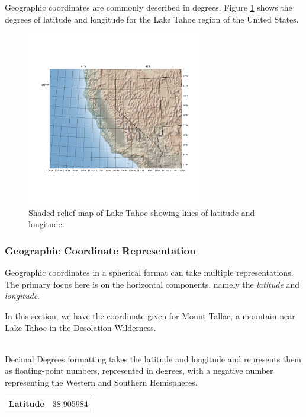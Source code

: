 Geographic coordinates are commonly described in degrees.  Figure 
\ref{fig:figure_1_1} shows the degrees of latitude and longitude
for the Lake Tahoe region of the United States.

\begin{figure}[h!]
\includegraphics[width=3in]{chapter1/diagrams/figure_1_1.png}
\caption{Shaded relief map of Lake Tahoe showing lines of latitude and longitude.}
\label{fig:figure_1_1}
\end{figure}


\subsubsection*{Geographic Coordinate Representation}

Geographic coordinates in a spherical format can take multiple representations.  The primary focus
here is on the horizontal components, namely the \emph{latitude} and \emph{longitude}.

In this section, we have the coordinate given for Mount Tallac, a mountain near Lake Tahoe in the
Desolation Wilderness.  

\vspace{5mm}
\\

Decimal Degrees formatting takes the latitude and longitude and represents them as floating-point numbers,
represented in degrees, with a negative number representing the Western and Southern Hemispheres.

\begin{table}[h!]
\begin{tabular}{l l}
\textbf{Latitude} & 38.905984
\end{tabular}
\end{table}

